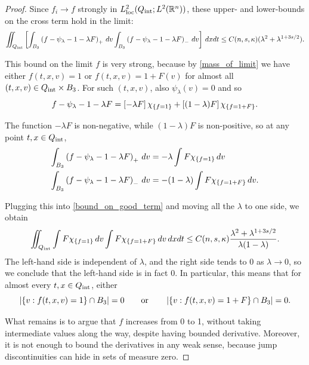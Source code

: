 \begin{proof}
Since $f_i \to f$ strongly in $L^2_{\text{loc}}({Q_\textrm{int}};L^2(\mathbb{R}^n))$, these upper- and lower-bounds on the cross term hold in the limit:
\begin{equation}\label{bound_on_good_term}
\iint_{Q_\textrm{int}} \left[  \int_{B_3} \left( f-\psi_\lambda-1-\lambda F \right)_+ \,dv \int_{B_3} \left( f-\psi_\lambda-1-\lambda F \right)_- \,dv \right] \,dxdt \leq C(n,s,\kappa) (\lambda^2 + \lambda^{1+3s/2}). 
\end{equation}

This bound on the limit $f$ is very strong, because by \eqref{mass_of_limit} we have either $f(t,x,v)=1$ or $f(t,x,v) = 1 + F(v)$ for almost all $(t,x,v) \in {Q_\textrm{int}} \times B_3$.  For such $(t,x,v)$, also $\psi_\lambda(v)=0$ and so
\[ f-\psi_\lambda - 1 - \lambda F = \left[ -\lambda F \right] \chi_{\{f=1	\}} + \left[ (1-\lambda) F \right] \chi_{\{f=1+F\}}. \]

The function $-\lambda F$ is non-negative, while $(1-\lambda)F$ is non-positive, so at any point $t,x \in {Q_\textrm{int}}$,
\begin{align*}
\int_{B_3} \left( f-\psi_\lambda-1-\lambda F \right)_+ \,dv &= -\lambda \int F \chi_{\{f=1\}} \,dv \\
\int_{B_3} \left( f-\psi_\lambda-1-\lambda F \right)_- \,dv &= -(1-\lambda) \int F \chi_{\{f=1+F\}} \,dv.
\end{align*} 

Plugging this into \eqref{bound_on_good_term} and moving all the $\lambda$ to one side, we obtain
\[ \iint_{Q_\textrm{int}} \int F \chi_{\{f=1\}} \,dv \int F \chi_{\{f=1+F\}} \,dv \,dxdt \leq C(n,s,\kappa) \frac{\lambda^2 + \lambda^{1+3s/2}}{\lambda(1-\lambda)}. \]
The left-hand side is independent of $\lambda$, and the right side tends to 0 as $\lambda \to 0$, so we conclude that the left-hand side is in fact 0.  In particular, this means that for almost every $t,x \in {Q_\textrm{int}}$, either
\begin{equation}\label{constant_in_v}
\left\lvert \{v: f(t,x,v) = 1\} \cap B_3  \right\rvert = 0 \qquad \textrm{or} \qquad \left\lvert \{v: f(t,x,v) = 1+F\} \cap B_3  \right\rvert = 0. 
\end{equation}



What remains is to argue that $f$ increases from 0 to 1, without taking intermediate values along the way, despite having bounded derivative.  Moreover, it is not enough to bound the derivatives in any weak sense, because jump discontinuities can hide in sets of measure zero.  


\end{proof}
